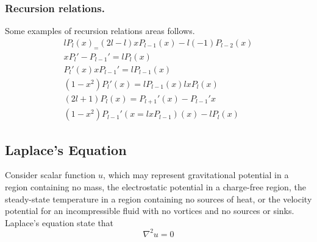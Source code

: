\documentclass[../main.tex]{subfiles}
\begin{document}
\subsubsection*{Recursion relations.} Some examples of recursion
relations areas follows.
\begin{gather*}
    lP_l(x)_=(2l-l)xP_{l-1}(x)-l(-1)P_{l-2}(x)\\
    xP_l'-P_{l-1}'=lP_l(x)\\
    P_l'(x)xP_{l-1}'=lP_{l-1}(x)\\
    (1-x^2)P_l'(x)=lP_{l-1}(x)lxP_l(x)\\
    (2l+1)P_l(x)=P_{l+1}'(x)-P_{l-1}'{x}\\
    (1-x^2)P_{l-1}'(x=lxP_{l-1})(x)-lP_{l}(x)
\end{gather*}

\subsection*{Laplace's Equation}
Consider scalar function $u$, which may represent gravitational potential in a region containing no mass, the electrostatic potential in a charge-free region, the steady-state temperature in a region containing no sources of heat, or the velocity potential for an incompressible fluid with no vortices and no sources or sinks. Laplace's equation state that 
\begin{equation*}
    \nabla^2 u=0
\end{equation*}
\end{document}
